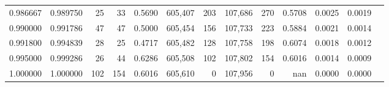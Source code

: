 \begin{tabular}{rrrrrrrrrrrrr}
0.986667 & 0.989750 &    25 &  33 &                                     0.5690 & 605,407 &     203 & 107,686 &     270 & 0.5708 & 0.0025 & 0.0019 \\
0.990000 & 0.991786 &    47 &  47 &                                     0.5000 & 605,454 &     156 & 107,733 &     223 & 0.5884 & 0.0021 & 0.0014 \\
0.991800 & 0.994839 &    28 &  25 &                                     0.4717 & 605,482 &     128 & 107,758 &     198 & 0.6074 & 0.0018 & 0.0012 \\
0.995000 & 0.999286 &    26 &  44 &                                     0.6286 & 605,508 &     102 & 107,802 &     154 & 0.6016 & 0.0014 & 0.0009 \\
1.000000 & 1.000000 &   102 & 154 &                                     0.6016 & 605,610 &       0 & 107,956 &       0 &    nan & 0.0000 & 0.0000 \\
\bottomrule
\end{tabular}
